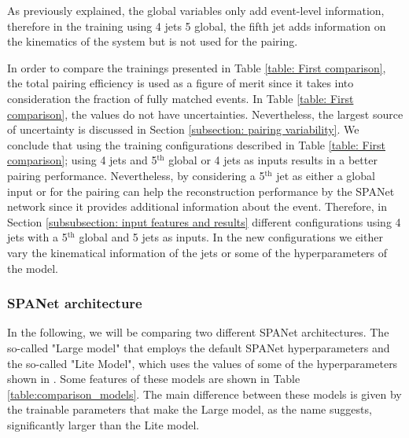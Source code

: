 As previously explained, the global variables only add event-level information, therefore in the training using 4 jets 5 global, the fifth jet adds information on the kinematics of the system but is not used for the pairing.

In order to compare the trainings presented in Table \ref{table: First comparison}, the total pairing efficiency is used as a figure of merit since it takes into consideration the fraction of fully matched events. In Table \ref{table: First comparison}, the values do not have uncertainties. Nevertheless, the largest source of uncertainty is discussed in Section \ref{subsection: pairing variability}.
We conclude that using the training configurations described in Table \ref{table: First comparison}; using 4 jets and 5$^{\text{th}}$ global or 4 jets as inputs results in a better pairing performance. Nevertheless, by considering a 5$^{\text{th}}$ jet as either a global input or for the pairing can help the reconstruction performance by the SPANet network since it provides additional information about the event. Therefore, in Section \ref{subsubsection: input features and results} different configurations using 4 jets with a 5$^{\text{th}}$ global and 5 jets as inputs. In the new configurations we either vary the kinematical information of the jets or some of the hyperparameters of the model. 

\newpage

\subsubsection{SPANet architecture} \label{large vs lite model}
In the following, we will be comparing two different SPANet architectures. The so-called "Large model" that employs the default SPANet hyperparameters and the so-called "Lite Model", which uses the values of some of the hyperparameters shown in \cite{ATLASparam}. Some features of these models are shown in Table \ref{table:comparison_models}. The main difference between these models is given by the trainable parameters that make the Large model, as the name suggests, significantly larger than the Lite model.

